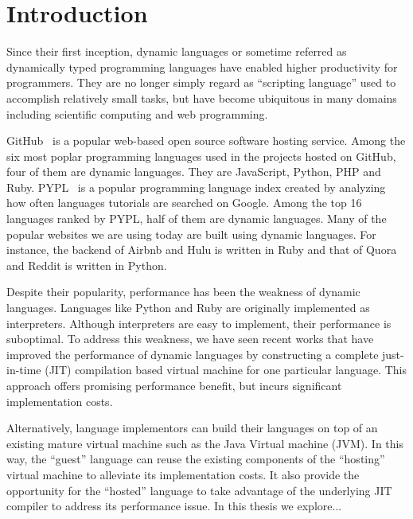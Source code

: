 \chapter{Introduction}

Since their first inception, dynamic languages or sometime referred as dynamically typed programming languages have enabled higher productivity for programmers.
They are no longer simply regard as ``scripting language'' used to accomplish relatively small tasks,
but have become ubiquitous in many domains including scientific computing and web programming.

GitHub~\cite{github} is a popular web-based open source software hosting service.
Among the six most poplar programming languages used in the projects hosted on GitHub, four of them are dynamic languages.
They are JavaScript, Python, PHP and Ruby.
PYPL~\cite{pypl} is a popular programming language index created by analyzing how often languages tutorials are searched on Google.
Among the top 16 languages ranked by PYPL, half of them are dynamic languages.
Many of the popular websites we are using today are built using dynamic languages.
For instance, the backend of Airbnb and Hulu is written in Ruby and that of Quora and Reddit is written in Python.

Despite their popularity, performance has been the weakness of dynamic languages.
Languages like Python and Ruby are originally implemented as interpreters.
Although interpreters are easy to implement, their performance is suboptimal.
To address this weakness, we have seen recent works that have improved the performance of dynamic languages
by constructing a complete just-in-time (JIT) compilation based virtual machine for one particular language.
This approach offers promising performance benefit, but incurs significant implementation costs.

Alternatively, language implementors can build their languages on top of an existing mature virtual machine such as the Java Virtual machine (JVM).
In this way, the ``guest'' language can reuse the existing components of the ``hosting'' virtual machine to alleviate its implementation costs.
It also provide the opportunity for the ``hosted'' language to take advantage of the underlying JIT compiler to address its performance issue.
In this thesis we explore...


